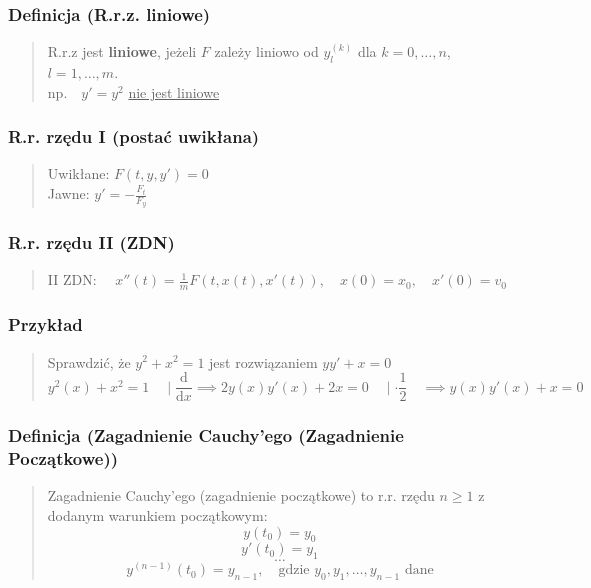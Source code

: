 \documentclass[10pt,a4paper]{article}
\begin{document}
{\subsubsection*{Definicja (R.r.z. liniowe)}
\begin{quote}
R.r.z jest \textbf{liniowe}, jeżeli $F$ zależy liniowo
od $y^{(k)}_l$ dla $k=0, \dots, n$, $l=1, \dots, m$.\\
$\mathrm{np.}\quad y'=y^2$ \underline{nie jest liniowe}
\end{quote}

\subsubsection*{R.r. rzędu I (postać uwikłana)}
\begin{quote}
Uwikłane: $F(t, y, y') = 0$\\
Jawne: $y' = -\frac{F_t}{F_y}$
\end{quote}

\subsubsection*{R.r. rzędu II (ZDN)}
\begin{quote}
II ZDN: $\quad x''(t) = \frac{1}{m} F(t, x(t), x'(t)), \quad x(0)=x_0, \quad x'(0)=v_0$
\end{quote}

\subsubsection*{Przykład}
\begin{quote}
Sprawdzić, że $y^2+x^2=1$ jest rozwiązaniem $y y' + x = 0$\\
$$y^2(x)+x^2=1 \quad \mid \frac{\mathrm{d}}{\mathrm{d}x} \implies 2y(x)y'(x)+2x=0 \quad \mid \cdot \frac{1}{2} \quad  \implies y(x)y'(x)+x=0$$
\end{quote}

\subsubsection*{Definicja (Zagadnienie Cauchy'ego (Zagadnienie Początkowe))}
\begin{quote}
Zagadnienie Cauchy'ego (zagadnienie początkowe) to r.r. rzędu $n \ge 1$ z dodanym warunkiem początkowym:\\
$$y(t_0)=y_0$$
$$y'(t_0)=y_1$$
$$\dots$$
$$y^{(n-1)}(t_0)=y_{n-1}, \quad \text{gdzie } y_0, y_1, \dots, y_{n-1} \text{ dane}$$
\end{quote}

}
\end{document}

